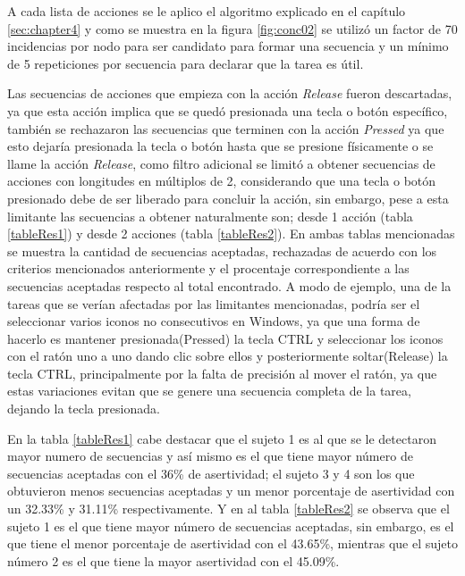 A cada lista de acciones se le aplico el algoritmo explicado en el cap\'itulo \ref{sec:chapter4} y como se muestra en la figura \ref{fig:conc02} se utiliz\'o un factor de 70 incidencias por nodo para ser candidato para formar una secuencia y un m\'inimo de 5 repeticiones por secuencia para declarar que la tarea es \'util. 


Las secuencias de acciones que empieza con la acci\'on \emph{Release} fueron descartadas, ya que esta acci\'on implica que se qued\'o presionada una tecla o bot\'on espec\'ifico, tambi\'en se rechazaron las secuencias que terminen con la acci\'on \emph{Pressed} ya que esto dejar\'ia presionada la tecla o bot\'on hasta que se presione f\'isicamente o se llame la acci\'on \emph{Release}, como filtro adicional se limit\'o a obtener secuencias de acciones con longitudes en m\'ultiplos de 2, considerando que una tecla o bot\'on presionado debe de ser liberado para concluir la acci\'on, sin embargo, pese a esta limitante las secuencias a obtener naturalmente son; desde 1 acci\'on (tabla \ref{tableRes1}) y desde 2 acciones (tabla \ref{tableRes2}). En ambas tablas mencionadas se muestra la cantidad de secuencias aceptadas, rechazadas de acuerdo con los criterios mencionados anteriormente y el procentaje correspondiente a las secuencias aceptadas respecto al total encontrado. A modo de ejemplo, una de la tareas que se ver\'ian afectadas por las limitantes mencionadas, podr\'ia ser el seleccionar varios iconos no consecutivos en Windows, ya que una forma de hacerlo es mantener presionada(Pressed) la tecla CTRL y seleccionar los iconos con el rat\'on uno a uno dando clic sobre ellos y posteriormente soltar(Release) la tecla CTRL, principalmente por la falta de precisi\'on al mover el rat\'on, ya que estas variaciones evitan que se genere una secuencia completa de la tarea, dejando la tecla presionada.


En la tabla \ref{tableRes1} cabe destacar que el sujeto 1 es al que se le detectaron mayor numero de secuencias y as\'i mismo es el que tiene mayor n\'umero de secuencias aceptadas con el 36\% de asertividad; el sujeto 3 y 4 son los que obtuvieron menos secuencias aceptadas y un menor porcentaje de asertividad con un 32.33\% y 31.11\% respectivamente. Y en al tabla \ref{tableRes2} se observa que el sujeto 1 es el que tiene mayor n\'umero de secuencias aceptadas, sin embargo, es el que tiene el menor porcentaje de asertividad con el 43.65\%, mientras que el sujeto n\'umero 2 es el que tiene la mayor asertividad con el 45.09\%.


